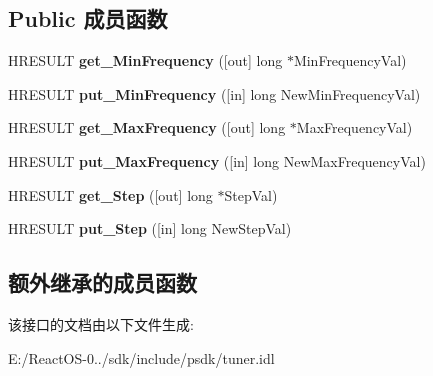\subsection*{Public 成员函数}
\begin{DoxyCompactItemize}
\item 
\mbox{\label{interface_i_analog_radio_tuning_space_ab0218267ae339b8f73dd7a3235a90890}} 
H\+R\+E\+S\+U\+LT {\bfseries get\+\_\+\+Min\+Frequency} (\mbox{[}out\mbox{]} long $\ast$Min\+Frequency\+Val)
\item 
\mbox{\label{interface_i_analog_radio_tuning_space_a302dabcec9e5165f61132cf54d28a14c}} 
H\+R\+E\+S\+U\+LT {\bfseries put\+\_\+\+Min\+Frequency} (\mbox{[}in\mbox{]} long New\+Min\+Frequency\+Val)
\item 
\mbox{\label{interface_i_analog_radio_tuning_space_a3037315dbe8dd0c993065ed3f033389a}} 
H\+R\+E\+S\+U\+LT {\bfseries get\+\_\+\+Max\+Frequency} (\mbox{[}out\mbox{]} long $\ast$Max\+Frequency\+Val)
\item 
\mbox{\label{interface_i_analog_radio_tuning_space_a77756f14bf3d60fa49f297aa472f9c6e}} 
H\+R\+E\+S\+U\+LT {\bfseries put\+\_\+\+Max\+Frequency} (\mbox{[}in\mbox{]} long New\+Max\+Frequency\+Val)
\item 
\mbox{\label{interface_i_analog_radio_tuning_space_a71a5702f07aee8b53300bdd9a1f1823f}} 
H\+R\+E\+S\+U\+LT {\bfseries get\+\_\+\+Step} (\mbox{[}out\mbox{]} long $\ast$Step\+Val)
\item 
\mbox{\label{interface_i_analog_radio_tuning_space_a5b23f1e25ec0c73cdb3d20e4b342f51d}} 
H\+R\+E\+S\+U\+LT {\bfseries put\+\_\+\+Step} (\mbox{[}in\mbox{]} long New\+Step\+Val)
\end{DoxyCompactItemize}
\subsection*{额外继承的成员函数}


该接口的文档由以下文件生成\+:\begin{DoxyCompactItemize}
\item 
E\+:/\+React\+O\+S-\/0../sdk/include/psdk/tuner.\+idl\end{DoxyCompactItemize}
